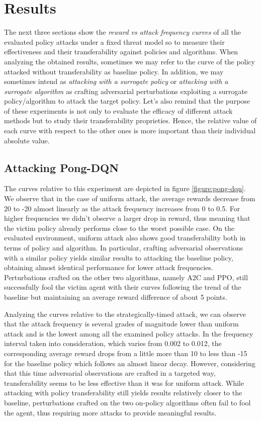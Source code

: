 \section{Results}
The next three sections show the {\it reward vs attack frequency curves} of all the evaluated policy attacks under a fixed threat model so to measure their effectiveness and their transferability against policies and algorithms. When analyzing the obtained results, sometimes we may refer to the curve of the policy attacked without transferability as baseline policy. In addition, we may sometimes intend as {\it attacking with a surrogate policy} or {\it attacking with a surrogate algorithm} as crafting adversarial perturbations exploiting a surrogate policy/algorithm to attack the target policy. Let's also remind that the purpose of these experiments is not only to evaluate the efficacy of different attack methods but to study their transferability proprieties. Hence, the relative value of each curve with respect to the other ones is more important than their individual absolute value.

\subsection{Attacking Pong-DQN}
The curves relative to this experiment are depicted in figure \ref{figure:pong-dqn}. We observe that in the case of uniform attack, the average rewards decrease from 20 to -20 almost linearly as the attack frequency increases from 0 to 0.5. For higher frequencies we didn't observe a larger drop in reward, thus meaning that the victim policy already performs close to the worst possible case. On the evaluated environment, uniform attack also shows good transferability both in terms of policy and algorithm. In particular, crafting adversarial observations with a similar policy yields similar results to attacking the baseline policy, obtaining almost identical performance for lower attack frequencies. Perturbations crafted on the other two algorithms, namely A2C and PPO, still successfully fool the victim agent with their curves following the trend of the baseline but maintaining an average reward difference of about 5 points.

Analyzing the curves relative to the strategically-timed attack, we can observe that the attack frequency is several grades of magnitude lower than uniform attack and is the lowest among all the examined policy attacks. In the frequency interval taken into consideration, which varies from 0.002 to 0.012, the corresponding average reward drops from a little more than 10 to less than -15 for the baseline policy which follows an almost linear decay. However, considering that this time adversarial observations are crafted in a targeted way, transferability seems to be less effective than it was for uniform attack. While attacking with policy transferability still yields results relatively closer to the baseline, perturbations crafted on the two on-policy algorithms often fail to fool the agent, thus requiring more attacks to provide meaningful results. 

